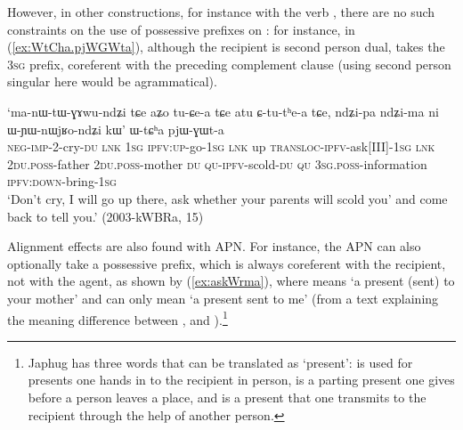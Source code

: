 However, in other constructions, for instance with the verb , there are no such constraints on the use of possessive prefixes on : for instance, in (\ref{ex:WtCha.pjWGWta}), although the recipient is second person dual,  takes the \textsc{3sg} prefix, coreferent with the preceding complement clause (using second person singular  here would be agrammatical).

\begin{exe}
\ex \label{ex:WtCha.pjWGWta}
\gll `ma-nɯ-tɯ-ɣɤwu-ndʑi tɕe aʑo tu-ɕe-a tɕe atu ɕ-tu-tʰe-a tɕe,
ndʑi-pa ndʑi-ma ni ɯ-ɲɯ-nɯjʁo-ndʑi kɯ' ɯ-tɕʰa pjɯ-ɣɯt-a \\
\textsc{neg}-\textsc{imp}-2-cry-\textsc{du} \textsc{lnk} \textsc{1sg} \textsc{ipfv}:\textsc{up}-go-\textsc{1sg} \textsc{lnk} up \textsc{transloc}-\textsc{ipfv}-ask[III]-\textsc{1sg} \textsc{lnk} \textsc{2du}.\textsc{poss}-father \textsc{2du}.\textsc{poss}-mother \textsc{du} \textsc{qu}-\textsc{ipfv}-scold-\textsc{du} \textsc{qu} \textsc{3sg}.\textsc{poss}-information \textsc{ipfv}:\textsc{down}-bring-\textsc{1sg} \\
\glt `Don't cry, I will go up there, ask whether your parents will scold you' and come back to tell you.' (2003-kWBRa, 15)
\end{exe}

Alignment effects are also found with APN. For instance, the APN  can also optionally take a possessive prefix, which is always coreferent with the recipient, not with the agent, as shown by (\ref{ex:askWrma}), where  means `a present (sent) to your mother' and  can only mean `a present sent to me' (from a text explaining the meaning difference between ,  and ).\footnote{Japhug has three words that can be translated as `present':  is used for presents one hands in to the recipient in person,  is a parting present one gives before a person leaves a place, and  is a present that one transmits to the recipient through the help of another person.}

